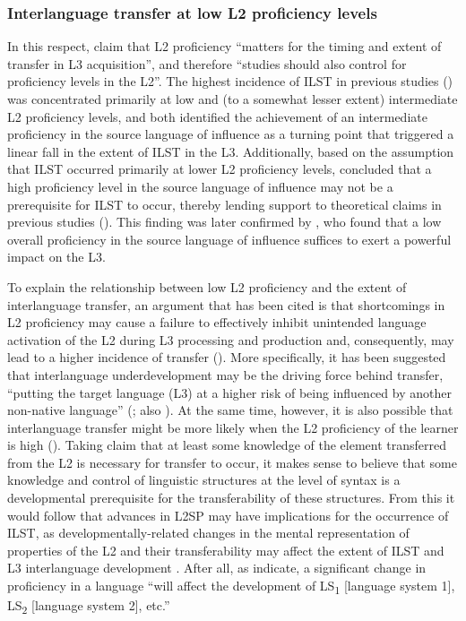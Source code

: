 \documentclass[output=paper,modfonts,nonflat, newtxmath]{langsci/langscibook}
\begin{document}
\subsubsection{Interlanguage transfer at low L2 proficiency levels}%

In this respect, \citet[24]{MontrulEtAl2011} claim that L2 proficiency “matters for the timing and extent of transfer in L3 acquisition”, and therefore “studies should also control for proficiency levels in the L2”. The highest incidence of ILST in previous studies (\citealt{Sánchez2011,SánchezBardel2017}) was concentrated primarily at low and (to a somewhat lesser extent) intermediate L2 proficiency levels, and both identified the achievement of an intermediate proficiency in the source language of influence as a turning point that triggered a linear fall in the extent of ILST in the L3. Additionally, based on the assumption that ILST occurred primarily at lower L2 proficiency levels, \citet{Sánchez2011} concluded that a high proficiency level in the source language of influence may not be a prerequisite for ILST to occur, thereby lending support to theoretical claims in previous studies (\citealt{DeAngelisSelinker2001,DeAngelis2007,Ringbom2007,Rast2010,Sánchez2012}). This finding was later confirmed by \citet{SánchezBardel2017}, who found that a low overall proficiency in the source language of influence suffices to exert a powerful impact on the L3.

To explain the relationship between low L2 proficiency and the extent of interlanguage transfer, an argument that has been cited is that shortcomings in L2 proficiency may cause a failure to effectively inhibit unintended language activation of the L2 during L3 processing and production and, consequently, may lead to a higher incidence of transfer (\citealt{Shanon1991,Dewaele2001,DeBot2004}). More specifically, it has been suggested that interlanguage underdevelopment may be the driving force behind transfer, “putting the target language (L3) at a higher risk of being influenced by another non-native language” (\citealt[241]{SánchezBardel2017}; also \citealt{Leung2003,Leung2005,Sánchez2011}). At the same time, however, it is also possible that interlanguage transfer might be more likely when the L2 proficiency of the learner is high (\citealt{Odlin1990,Dewaele1998,Dentler2000,Hammarberg2001,Ringbom2001,Ringbom2007}). Taking  claim that at least some knowledge of the element transferred from the L2 is necessary for transfer to occur, it makes sense to believe that some knowledge and control of linguistic structures at the level of syntax is a developmental prerequisite for the transferability of these structures. From this it would follow that advances in L2SP may have implications for the occurrence of ILST, as developmentally-related changes in the mental representation of properties of the L2 and their transferability may affect the extent of ILST and L3 interlanguage development \citep{Sánchez2011}. After all, as \citet[40]{HerdinaJessner2002} indicate, a significant change in proficiency in a language “will affect the development of LS\textsubscript{1} [language system 1], LS\textsubscript{2} [language system 2], etc.”
\end{document}

